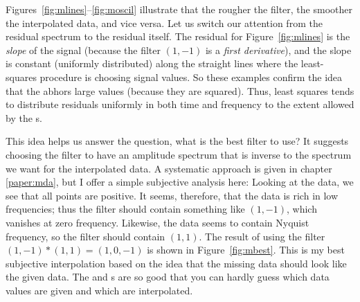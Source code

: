 \par
Figures~\ref{fig:mlines}--\ref{fig:moscil}
illustrate that the rougher the filter,
the smoother the interpolated data,
and vice versa.
Let us switch our attention from the residual spectrum
to the residual itself.
The residual for Figure~\ref{fig:mlines}
is the {\it slope} of the signal
(because the filter $(1,-1)$ is a {\it first derivative}),
and the slope is constant (uniformly distributed) along the straight lines
where the least-squares procedure is choosing signal values.
So these examples confirm the idea
that the  abhors large values
(because they are squared).
Thus, least squares tends to distribute residuals uniformly
in both time and frequency to the extent
allowed by the s.
\par
This idea helps us answer the question,
what is the best filter to use?
It suggests choosing
the filter to have an amplitude spectrum
that is inverse to the spectrum we want for the interpolated data.
A systematic approach is given in chapter \ref{paper:mda},
but I offer a simple subjective analysis here:
Looking at the data, we see that all points are positive.
It seems, therefore, that
the data is rich in low frequencies;
thus the filter should contain something like $(1,-1)$,
which vanishes at zero frequency.
Likewise, the data seems to contain Nyquist frequency,
so the filter should contain $(1,1)$.
The result of using the filter $(1,-1)\ast (1,1)=(1,0,-1)$
is shown in Figure~\ref{fig:mbest}.
This is my best subjective interpolation
based on the idea that the missing data should look like the given data.
The  and s are so good that
you can hardly guess which data values are given
and which are interpolated.

